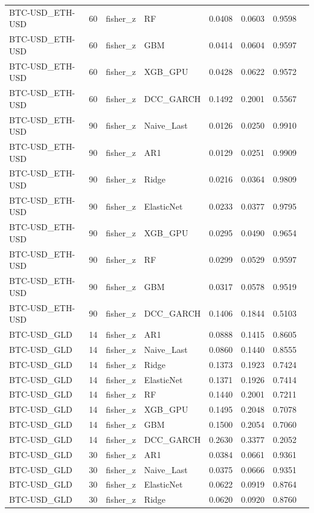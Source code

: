 \begin{table}[H]
\begin{tabular}{llllrrrr}
BTC-USD_ETH-USD & 60 & fisher_z & RF & 0.0408 & 0.0603 & 0.9598 &  \\
BTC-USD_ETH-USD & 60 & fisher_z & GBM & 0.0414 & 0.0604 & 0.9597 &  \\
BTC-USD_ETH-USD & 60 & fisher_z & XGB_GPU & 0.0428 & 0.0622 & 0.9572 &  \\
BTC-USD_ETH-USD & 60 & fisher_z & DCC_GARCH & 0.1492 & 0.2001 & 0.5567 &  \\
BTC-USD_ETH-USD & 90 & fisher_z & Naive_Last & 0.0126 & 0.0250 & 0.9910 &  \\
BTC-USD_ETH-USD & 90 & fisher_z & AR1 & 0.0129 & 0.0251 & 0.9909 &  \\
BTC-USD_ETH-USD & 90 & fisher_z & Ridge & 0.0216 & 0.0364 & 0.9809 &  \\
BTC-USD_ETH-USD & 90 & fisher_z & ElasticNet & 0.0233 & 0.0377 & 0.9795 &  \\
BTC-USD_ETH-USD & 90 & fisher_z & XGB_GPU & 0.0295 & 0.0490 & 0.9654 &  \\
BTC-USD_ETH-USD & 90 & fisher_z & RF & 0.0299 & 0.0529 & 0.9597 &  \\
BTC-USD_ETH-USD & 90 & fisher_z & GBM & 0.0317 & 0.0578 & 0.9519 &  \\
BTC-USD_ETH-USD & 90 & fisher_z & DCC_GARCH & 0.1406 & 0.1844 & 0.5103 &  \\
BTC-USD_GLD & 14 & fisher_z & AR1 & 0.0888 & 0.1415 & 0.8605 &  \\
BTC-USD_GLD & 14 & fisher_z & Naive_Last & 0.0860 & 0.1440 & 0.8555 &  \\
BTC-USD_GLD & 14 & fisher_z & Ridge & 0.1373 & 0.1923 & 0.7424 &  \\
BTC-USD_GLD & 14 & fisher_z & ElasticNet & 0.1371 & 0.1926 & 0.7414 &  \\
BTC-USD_GLD & 14 & fisher_z & RF & 0.1440 & 0.2001 & 0.7211 &  \\
BTC-USD_GLD & 14 & fisher_z & XGB_GPU & 0.1495 & 0.2048 & 0.7078 &  \\
BTC-USD_GLD & 14 & fisher_z & GBM & 0.1500 & 0.2054 & 0.7060 &  \\
BTC-USD_GLD & 14 & fisher_z & DCC_GARCH & 0.2630 & 0.3377 & 0.2052 &  \\
BTC-USD_GLD & 30 & fisher_z & AR1 & 0.0384 & 0.0661 & 0.9361 &  \\
BTC-USD_GLD & 30 & fisher_z & Naive_Last & 0.0375 & 0.0666 & 0.9351 &  \\
BTC-USD_GLD & 30 & fisher_z & ElasticNet & 0.0622 & 0.0919 & 0.8764 &  \\
BTC-USD_GLD & 30 & fisher_z & Ridge & 0.0620 & 0.0920 & 0.8760 &  \\

\end{tabular}
\end{table}
